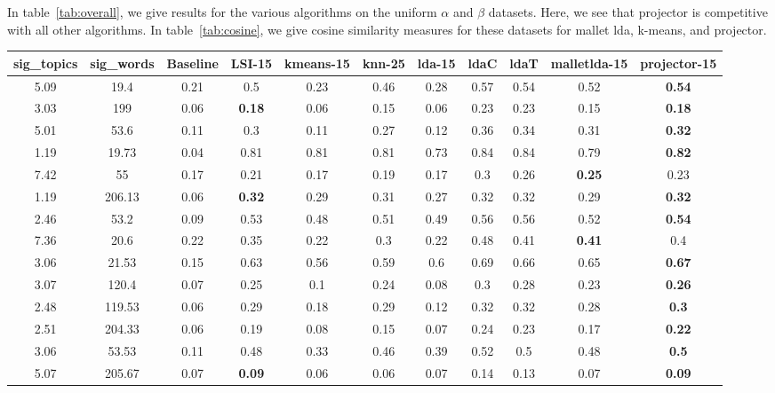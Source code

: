 In table~\ref{tab:overall}, we give results for the various algorithms
on the uniform $\alpha$ and $\beta$ datasets.  Here, we see that projector
is competitive with all other algorithms.  In table~\ref{tab:cosine}, we 
give cosine similarity measures for these datasets for mallet lda, k-means,
and projector. 

\begin{table}
{\tiny
\begin{tabular}{|c|c|c|c|c|c|c|c|c|c|c|}
\hline 
sig\_topics &sig\_words &Baseline &LSI-15 &kmeans-15 &knn-25 &lda-15 &ldaC &ldaT &malletlda-15 &projector-15 \\
 \hline 
5.09  &19.4  &0.21  &0.5  &0.23  &0.46  &0.28  &0.57  &0.54  &0.52  &\textbf{0.54}
  \\
 \hline 
3.03  &199  &0.06  &\textbf{0.18}
  &0.06  &0.15  &0.06  &0.23  &0.23  &0.15  &\textbf{0.18}
  \\
 \hline 
5.01  &53.6  &0.11  &0.3  &0.11  &0.27  &0.12  &0.36  &0.34  &0.31  &\textbf{0.32}
  \\
 \hline 
1.19  &19.73  &0.04  &0.81  &0.81  &0.81  &0.73  &0.84  &0.84  &0.79  &\textbf{0.82}
  \\
 \hline 
7.42  &55  &0.17  &0.21  &0.17  &0.19  &0.17  &0.3  &0.26  &\textbf{0.25}
  &0.23  \\
 \hline 
1.19  &206.13  &0.06  &\textbf{0.32}
  &0.29  &0.31  &0.27  &0.32  &0.32  &0.29  &\textbf{0.32}
  \\
 \hline 
2.46  &53.2  &0.09  &0.53  &0.48  &0.51  &0.49  &0.56  &0.56  &0.52  &\textbf{0.54}
  \\
 \hline 
7.36  &20.6  &0.22  &0.35  &0.22  &0.3  &0.22  &0.48  &0.41  &\textbf{0.41}
  &0.4  \\
 \hline 
3.06  &21.53  &0.15  &0.63  &0.56  &0.59  &0.6  &0.69  &0.66  &0.65  &\textbf{0.67}
  \\
 \hline 
3.07  &120.4  &0.07  &0.25  &0.1  &0.24  &0.08  &0.3  &0.28  &0.23  &\textbf{0.26}
  \\
 \hline 
2.48  &119.53  &0.06  &0.29  &0.18  &0.29  &0.12  &0.32  &0.32  &0.28  &\textbf{0.3}
  \\
 \hline 
2.51  &204.33  &0.06  &0.19  &0.08  &0.15  &0.07  &0.24  &0.23  &0.17  &\textbf{0.22}
  \\
 \hline 
3.06  &53.53  &0.11  &0.48  &0.33  &0.46  &0.39  &0.52  &0.5  &0.48  &\textbf{0.5}
  \\
 \hline 
5.07  &205.67  &0.07  &\textbf{0.09}
  &0.06  &0.06  &0.07  &0.14  &0.13  &0.07  &\textbf{0.09}
  \\

\end{tabular}}
\end{table}
